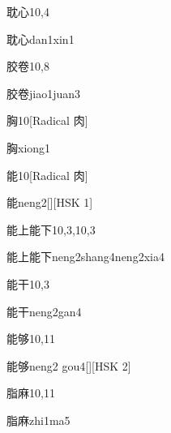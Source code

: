 \begin{entry}{耽心}{10,4}
  \begin{phonetics}{耽心}{dan1xin1}
  \end{phonetics}
\end{entry}

\begin{entry}{胶卷}{10,8}
  \begin{phonetics}{胶卷}{jiao1juan3}
  \end{phonetics}
\end{entry}

\begin{entry}{胸}{10}[Radical 肉]
  \begin{phonetics}{胸}{xiong1}
  \end{phonetics}
\end{entry}

\begin{entry}{能}{10}[Radical 肉]
  \begin{phonetics}{能}{neng2}[][HSK 1]
  \end{phonetics}
\end{entry}

\begin{entry}{能上能下}{10,3,10,3}
  \begin{phonetics}{能上能下}{neng2shang4neng2xia4}
  \end{phonetics}
\end{entry}

\begin{entry}{能干}{10,3}
  \begin{phonetics}{能干}{neng2gan4}
  \end{phonetics}
\end{entry}

\begin{entry}{能够}{10,11}
  \begin{phonetics}{能够}{neng2 gou4}[][HSK 2]
  \end{phonetics}
\end{entry}

\begin{entry}{脂麻}{10,11}
  \begin{phonetics}{脂麻}{zhi1ma5}
  \end{phonetics}
\end{entry}

